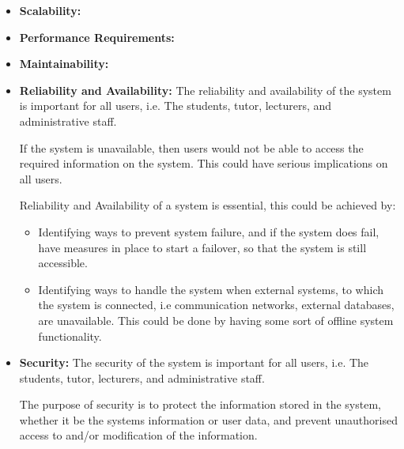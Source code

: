 
\begin{flushleft}
	\begin{itemize}
		\item \textbf{Scalability:} 
		\item \textbf{Performance Requirements:} 
		\item \textbf{Maintainability:} 
	
		\item \textbf{Reliability and Availability:} 
The reliability and availability of the system is important for all users, i.e. The students, tutor, lecturers, and administrative staff.
\newline

If the system is unavailable, then users would not be able to access the required information on the system. This could have serious implications on all users.	\newline

Reliability and Availability of a system is essential, this could be achieved by:
\begin{itemize}
\item Identifying ways to prevent system failure, and if the system does fail, have measures in place to start a failover, so that the system is still accessible.
\item Identifying ways to handle the system when external systems, to which the system is connected, i.e communication networks, external databases, are unavailable. This could be done by having some sort of offline system functionality.
\end{itemize}

	
		
		\item \textbf{Security:} 
The security of the system is important for all users, i.e. The students, tutor, lecturers, and administrative staff.
\newline

The purpose of security is to protect the information stored in the system, whether it be the systems information or user data, and prevent unauthorised access to and/or modification of the information.
\newline


\end{itemize}
\end{flushleft}
